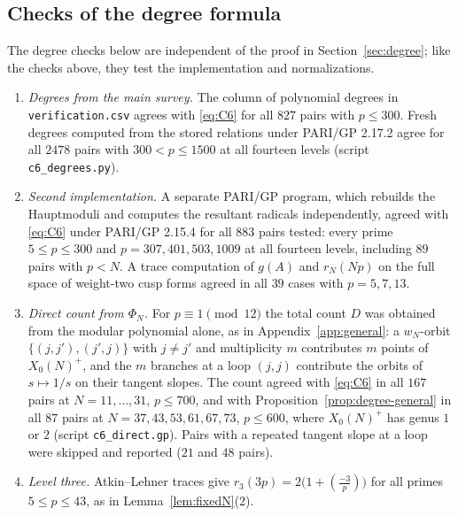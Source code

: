 \documentclass[11pt,a4paper]{article}
\theoremstyle{remark}\newtheorem{remark}[theorem]{Remark}
\numberwithin{equation}{section}
\newcommand{\leg}[2]{\left(\frac{#1}{#2}\right)}
\begin{document}
	\subsection{Checks of the degree formula}\label{app:degree}
	The degree checks below are independent of the proof in Section~\ref{sec:degree}; like the checks above, they test the implementation and normalizations.
	\begin{enumerate}
		\item \emph{Degrees from the main survey.} The column of polynomial degrees in \texttt{verification.csv} agrees with \eqref{eq:C6} for all $827$ pairs with $p\leq300$. Fresh degrees computed from the stored relations under PARI/GP 2.17.2 agree for all $2478$ pairs with $300<p\leq1500$ at all fourteen levels (script \texttt{c6\_degrees.py}).
		\item \emph{Second implementation.} A separate PARI/GP program, which rebuilds the Hauptmoduli and computes the resultant radicals independently, agreed with \eqref{eq:C6} under PARI/GP 2.15.4 for all $883$ pairs tested: every prime $5\leq p\leq300$ and $p=307,401,503,1009$ at all fourteen levels, including $89$ pairs with $p<N$. A trace computation of $g(A)$ and $r_N(Np)$ on the full space of weight-two cusp forms agreed in all $39$ cases with $p=5,7,13$.
		\item \emph{Direct count from $\Phi_N$.} For $p\equiv1\pmod{12}$ the total count $D$ was obtained from the modular polynomial alone, as in Appendix~\ref{app:general}: a $w_N$-orbit $\{(j,j'),(j',j)\}$ with $j\neq j'$ and multiplicity $m$ contributes $m$ points of $X_0(N)^+$, and the $m$ branches at a loop $(j,j)$ contribute the orbits of $s\mapsto1/s$ on their tangent slopes. The count agreed with \eqref{eq:C6} in all $167$ pairs at $N=11,\dots,31$, $p\leq700$, and with Proposition~\ref{prop:degree-general} in all $87$ pairs at $N=37,43,53,61,67,73$, $p\leq600$, where $X_0(N)^+$ has genus $1$ or $2$ (script \texttt{c6\_direct.gp}). Pairs with a repeated tangent slope at a loop were skipped and reported ($21$ and $48$ pairs).
		\item \emph{Level three.} Atkin--Lehner traces give $r_3(3p)=2\bigl(1+\leg{-3}{p}\bigr)$ for all primes $5\leq p\leq43$, as in Lemma~\ref{lem:fixedN}(2).
	\end{enumerate}
	
\end{document}
